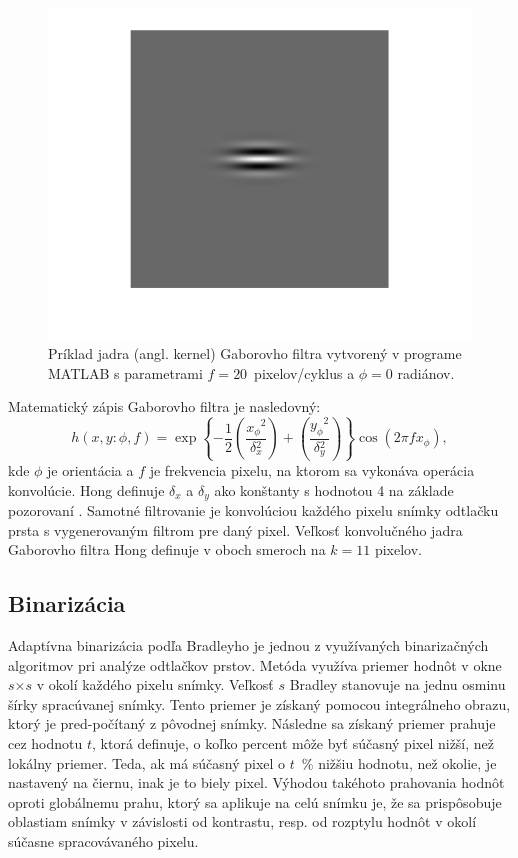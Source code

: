   \begin{figure}[h]
    \centering
    \includegraphics[width=0.25\linewidth]{obrazky-figures/gabor_kernel.png}
    \caption{Príklad jadra (angl. kernel) Gaborovho filtra vytvorený v programe MATLAB s parametrami {$f = 20$}~pixelov/cyklus a $\phi{} = 0$ radiánov.}
    \label{obr:gabor_kernel}
  \end{figure}
  Matematický zápis Gaborovho filtra je nasledovný:
  \begin{equation}
    h(x,y: \phi{}, f) = \exp{\left\{ -\frac{1}{2} \left( \frac{x_\phi{}^2}{\delta{}_x^2} \right) + \left( \frac{y_\phi{}^2}{\delta{}_y^2} \right) \right\}} \cos{}\left(2\pi{}fx_\phi{}\right),
  \end{equation}
  kde $\phi{}$ je orientácia a $f$ je frekvencia pixelu, na ktorom sa vykonáva operácia konvolúcie. Hong definuje $\delta{}_x$ a $\delta{}_y$
  ako konštanty s hodnotou 4 na základe pozorovaní \cite{Hong}. Samotné filtrovanie je konvolúciou každého pixelu snímky odtlačku prsta s vygenerovaným filtrom
  pre daný pixel. Veľkosť konvolučného jadra Gaborovho filtra Hong definuje v oboch smeroch na $k = 11$ pixelov.

  \subsection{Binarizácia} \label{sec:binarizacia}
  Adaptívna binarizácia podľa Bradleyho \cite{bradley2007adaptive} je jednou z využívaných binarizačných algoritmov pri analýze odtlačkov prstov.
  Metóda využíva priemer hodnôt v okne $s$$\times{}$$s$ v okolí každého pixelu snímky. Veľkosť $s$ Bradley stanovuje na jednu osminu šírky spracúvanej snímky.
  Tento priemer je získaný pomocou integrálneho obrazu, ktorý je pred-počítaný
  z pôvodnej snímky. Následne sa získaný priemer prahuje cez hodnotu $t$, ktorá definuje, o koľko percent môže byť súčasný pixel nižší, než lokálny priemer.
  Teda, ak má súčasný pixel o {$t$}~\% nižšiu hodnotu, než okolie, je nastavený na čiernu, inak je to biely pixel. Výhodou takéhoto prahovania hodnôt oproti
  globálnemu prahu, ktorý sa aplikuje na celú snímku je, že sa prispôsobuje oblastiam snímky v závislosti od kontrastu, resp. od rozptylu hodnôt v okolí
  súčasne spracovávaného pixelu.

